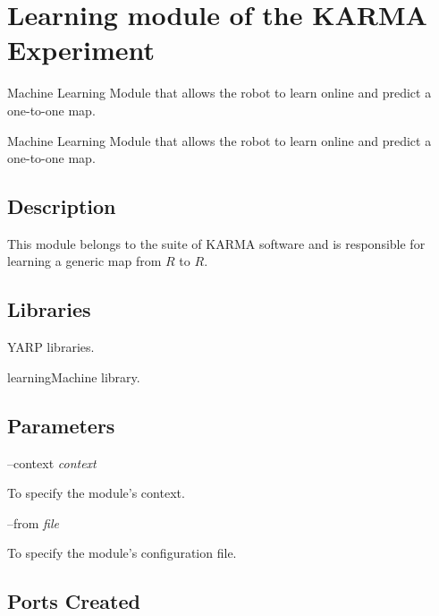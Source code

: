 \section{Learning module of the K\+A\+R\+M\+A Experiment}
\label{group__karmaLearn}


Machine Learning Module that allows the robot to learn online and predict a one-\/to-\/one map.  


Machine Learning Module that allows the robot to learn online and predict a one-\/to-\/one map. 

\hypertarget{group__karmaToolProjection_intro_sec}{}\subsection{Description}\label{group__karmaToolProjection_intro_sec}
This module belongs to the suite of K\+A\+R\+M\+A software and is responsible for learning a generic map from $ R $ to $ R $.\hypertarget{group__karmaToolProjection_lib_sec}{}\subsection{Libraries}\label{group__karmaToolProjection_lib_sec}

\begin{DoxyItemize}
\item Y\+A\+R\+P libraries.
\item learning\+Machine library.
\end{DoxyItemize}\hypertarget{group__karmaToolProjection_parameters_sec}{}\subsection{Parameters}\label{group__karmaToolProjection_parameters_sec}
--context {\itshape context} 
\begin{DoxyItemize}
\item To specify the module's context.
\end{DoxyItemize}

--from {\itshape file} 
\begin{DoxyItemize}
\item To specify the module's configuration file.
\end{DoxyItemize}\hypertarget{group__karmaToolProjection_portsc_sec}{}\subsection{Ports Created}\label{group__karmaToolProjection_portsc_sec}

